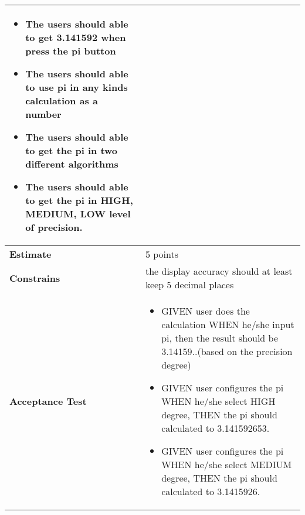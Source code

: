 \documentclass[12pt]{report}
\begin{document}
{\begin{tabular}{ |p{4cm}|p{11cm}|  }
 \begin{itemize}
     \item  The users should able to get 3.141592 when press the pi button
     \item  The users should able to use pi in any kinds calculation as a number
     \item  The users should able to get the pi in two different algorithms
     \item The users should able to get the pi in HIGH, MEDIUM, LOW level of precision.
\end{itemize}
\\
 \hline
 \textbf{Estimate} & 5 points  \\
 \hline
 \textbf{Constrains}& the display accuracy should at least keep 5 decimal places  \\
 \hline
  \textbf{Acceptance Test}& 
  \begin{itemize}
     \item  GIVEN user does the calculation WHEN he/she input pi, then the result should be 3.14159..(based on the precision degree)
     \item  GIVEN user configures the pi WHEN he/she select HIGH degree, THEN the pi should calculated to 3.141592653.
     \item  GIVEN user configures the pi WHEN he/she select MEDIUM degree, THEN the pi should calculated to 3.1415926.
\end{itemize}
\\
 \hline
\end{tabular}

}
\end{document}
